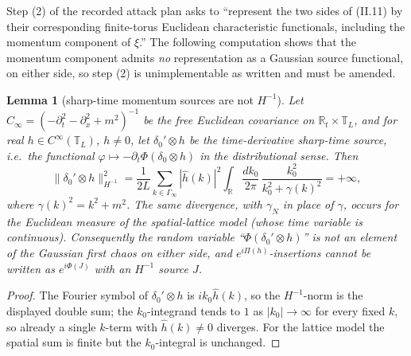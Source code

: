 \documentclass[11pt,a4paper]{article}
\theoremstyle{plain}
\newtheorem{lemma}[theorem]{Lemma}
\theoremstyle{definition}
\newcommand{\R}{\mathbb{R}}
\newcommand{\T}{\mathbb{T}}
\begin{document}
Step (2) of the recorded attack plan asks to ``represent the two sides of (II.11) by
their corresponding finite-torus Euclidean characteristic functionals, including the
momentum component of $\xi$.'' The following computation shows that the momentum
component admits \emph{no} representation as a Gaussian source functional, on either
side, so step (2) is unimplementable as written and must be amended.

\begin{lemma}[sharp-time momentum sources are not $H^{-1}$]\label{lem:nogo}
Let $C_\infty=(-\partial_t^2-\partial_x^2+m^2)^{-1}$ be the free Euclidean covariance
on $\R_t\times\T_L$, and for real $h\in C^\infty(\T_L)$, $h\ne0$, let
$\delta_0'\otimes h$ be the time-derivative sharp-time source, i.e.\ the functional
$\varphi\mapsto-\partial_t\Phi(\delta_0\otimes h)$ in the distributional sense. Then
\begin{equation}
 \bigl\|\delta_0'\otimes h\bigr\|_{H^{-1}}^2
 =\frac1{2L}\sum_{k\in\Gamma_\infty}|\widehat h(k)|^2
 \int_\R\frac{dk_0}{2\pi}\,\frac{k_0^2}{k_0^2+\gamma(k)^2}
 =+\infty ,
 \label{eq:nogo}
\end{equation}
where $\gamma(k)^2=k^2+m^2$. The same divergence, with $\gamma_N$ in place of
$\gamma$, occurs for the Euclidean measure of the spatial-lattice model (whose time
variable is continuous). Consequently the random variable ``$\Phi(\delta_0'\otimes h)$''
is not an element of the Gaussian first chaos on either side, and
$e^{i\Pi(h)}$-insertions cannot be written as $e^{i\Phi(J)}$ with an $H^{-1}$ source
$J$.
\end{lemma}

\begin{proof}
The Fourier symbol of $\delta_0'\otimes h$ is $ik_0\widehat h(k)$, so the
$H^{-1}$-norm is the displayed double sum; the $k_0$-integrand tends to $1$ as
$|k_0|\to\infty$ for every fixed $k$, so already a single $k$-term with
$\widehat h(k)\neq0$ diverges. For the lattice model the spatial sum is finite but the
$k_0$-integral is unchanged.
\end{proof}
\end{document}
